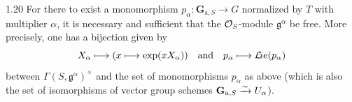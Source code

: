 \begin{corollary}{1.20}\label{XX.1.20}
For there to exist a monomorphism $p_\alpha:\mathbf G_{\mathrm a,S}\to G$ normalized by $T$ with multiplier $\alpha$, it is necessary and sufficient that the $\mathcal{O}_S$-module $\mathfrak g^\alpha$ be free. More precisely, one has a bijection given by
\[
X_\alpha\longmapsto(x\longmapsto\exp(xX_\alpha))\quad\text{and}\quad p_\alpha\longmapsto\mathcal{L}\!ie(p_\alpha)
\]
between $\Gamma(S,\mathfrak g^\alpha)^\times$ and the set of monomorphisms $p_\alpha$ as above (which is also the set of isomorphisms of vector group schemes $\mathbf G_{\mathrm a,S}\xrightarrow{\sim} U_\alpha$).{\renewcommand{\thefootnote}{(8)}}
\end{corollary}
